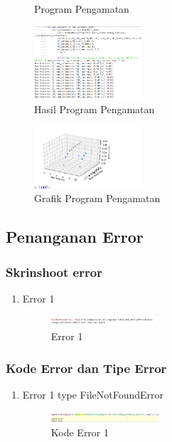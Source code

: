 \begin{enumerate}
\begin{figure}[H]
                \centering
                \caption{Program Pengamatan}
                \end{figure}
            \begin{figure}[H]
                \includegraphics[width=4cm]{figures/1174039/chapter3/22.png}
                \centering
                \caption{Hasil Program Pengamatan}
                \end{figure}
            \begin{figure}[H]
                \includegraphics[width=4cm]{figures/1174039/chapter3/matplot.png}
                \centering
                \caption{Grafik Program Pengamatan}
                \end{figure}
        \end{enumerate}
    \subsection{Penanganan Error}
        \subsubsection{Skrinshoot error}
            \begin{enumerate}
                \item Error 1
                \begin{figure}[H]
                    \includegraphics[width=4cm]{figures/1174039/chapter3/err1type.png}
                    \centering
                    \caption{Error 1}
                    \end{figure}
            \end{enumerate}
        \subsubsection{Kode Error dan Tipe Error}
            \begin{enumerate}
                \item Error 1 type FileNotFoundError
                \begin{figure}[H]
                    \includegraphics[width=4cm]{figures/1174039/chapter3/eror.png}
                    \centering
                    \caption{Kode Error 1}
                    \end{figure}
            \end{enumerate}

